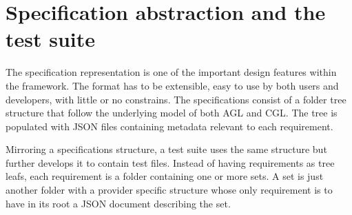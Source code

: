 \section{Specification abstraction and the test suite} \label{specs}
The specification representation is one of the important design features within the framework. The format has to be extensible, easy to use by both users and developers, with little or no constrains. The specifications consist of a folder tree structure that follow the underlying model of both AGL and CGL. The tree is populated with JSON files containing metadata relevant to each requirement.

Mirroring a specifications structure, a test suite uses the same structure but further develops it to contain test files. Instead of having requirements as tree leafs, each requirement is a folder containing one or more sets. A set is just another folder with a provider specific structure whose only requirement is to have in its root a JSON document describing the set.

